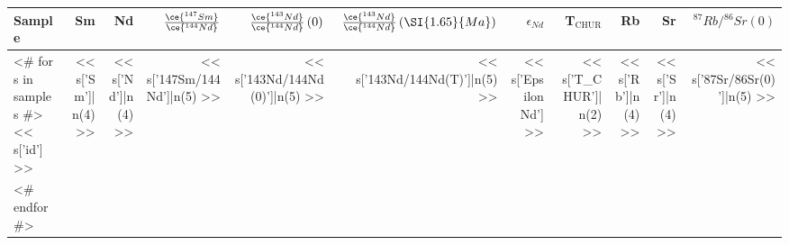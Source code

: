 \begin{tabular}{l r r r r r r r r r r}
\toprule
  Sample &
  Sm &
  Nd &
  $\frac{\ce{^{147}Sm}}{\ce{^{144}Nd}}$ &
  $\frac{\ce{^{143}Nd}}{\ce{^{144}Nd}}\left(0\right)$ &
  $\frac{\ce{^{143}Nd}}{\ce{^{144}Nd}}\left(\SI{1.65}{Ma}\right)$ &
  $\epsilon_{Nd}$ &
  T$_{\mathrm{CHUR}}$ &
  Rb & Sr &
  ${^{87}Rb}/{^{86}Sr}(0)$ \\
\midrule
<# for s in samples  #>
  << s['id'] >> &
  << s['Sm']| n(4) >> &
  << s['Nd']|n(4) >> &
  << s['147Sm/144Nd']|n(5) >> &
  << s['143Nd/144Nd(0)']|n(5) >> &
  << s['143Nd/144Nd(T)']|n(5) >> &
  << s['Epsilon Nd'] >> &
  << s['T_CHUR']| n(2) >> &
  << s['Rb']|n(4) >> &
  << s['Sr']|n(4) >> &
  << s['87Sr/86Sr(0)']|n(5) >> \\
<# endfor  #>

\bottomrule
\end{tabular}

